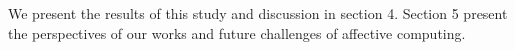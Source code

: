 \documentclass[10pt, a4paper]{article} %
\begin{document}
We present the results of this study and discussion in section 4. Section 5 present the perspectives of our works and future challenges of affective computing. 

 
%	
%	
%			
%			
\end{document}
